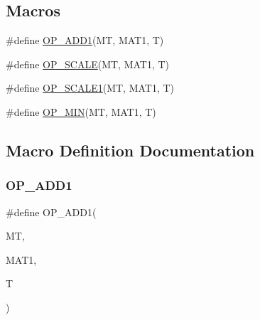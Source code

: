 \subsection*{Macros}
\begin{DoxyCompactItemize}
\item 
\#define \mbox{\hyperlink{adat-devel_2other__libs_2minuit_2inc_2Minuit2_2LaSum_8h_a1e1aec448e0ac3d142381b3d18396d9c}{O\+P\+\_\+\+A\+D\+D1}}(MT,  M\+A\+T1,  T)
\item 
\#define \mbox{\hyperlink{adat-devel_2other__libs_2minuit_2inc_2Minuit2_2LaSum_8h_a98526d803fb3de255b8696ed09b270da}{O\+P\+\_\+\+S\+C\+A\+LE}}(MT,  M\+A\+T1,  T)
\item 
\#define \mbox{\hyperlink{adat-devel_2other__libs_2minuit_2inc_2Minuit2_2LaSum_8h_a32b0d04af0cbd6fbaec10329792413f8}{O\+P\+\_\+\+S\+C\+A\+L\+E1}}(MT,  M\+A\+T1,  T)
\item 
\#define \mbox{\hyperlink{adat-devel_2other__libs_2minuit_2inc_2Minuit2_2LaSum_8h_a0d8d8b86f6d09edd6c9bce3bc55262af}{O\+P\+\_\+\+M\+IN}}(MT,  M\+A\+T1,  T)
\end{DoxyCompactItemize}


\subsection{Macro Definition Documentation}
\mbox{\label{adat-devel_2other__libs_2minuit_2inc_2Minuit2_2LaSum_8h_a1e1aec448e0ac3d142381b3d18396d9c}} 
\subsubsection{\texorpdfstring{OP\_ADD1}{OP\_ADD1}}
{\footnotesize\ttfamily \#define O\+P\+\_\+\+A\+D\+D1(\begin{DoxyParamCaption}\item[{}]{MT,  }\item[{}]{M\+A\+T1,  }\item[{}]{T }\end{DoxyParamCaption})}


